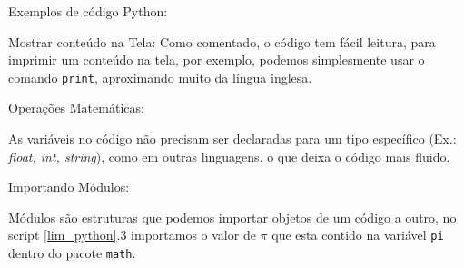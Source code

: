             Exemplos de código Python:

            Mostrar conteúdo na Tela:
            Como comentado, o código tem fácil leitura, para imprimir um conteúdo na tela, por exemplo, 
            podemos simplesmente usar o comando \verb|print|, aproximando muito da língua inglesa.  
            \begin{quote}
                                                       

            \end{quote}
            
            Operações Matemáticas:
            
            As variáveis no código não precisam ser declaradas para um 
            tipo específico (Ex.: \textit{float, int, string}), como em outras linguagens, o que deixa o código mais fluido. 
            \begin{quote}
            
                                                       
            \end{quote}
            
            Importando Módulos:
            
            Módulos são estruturas que podemos importar objetos de um código a outro,
            no script \ref{lim_python}.3 importamos o valor de $\pi$ que esta contido na variável \verb|pi| dentro do pacote \verb|math|. 
            
